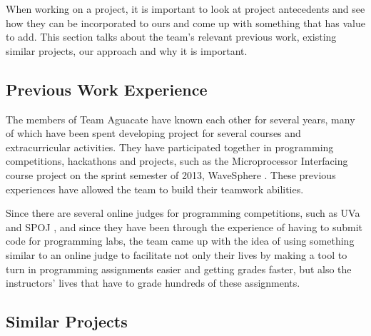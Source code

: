 When working on a project, it is important to look at project antecedents and
see how they can be incorporated to ours and come up with something that has
value to add. This section talks about the team's relevant previous work,
existing similar projects, our approach and why it is important.

\subsection{Previous Work Experience}

The members of Team Aguacate have known each other for several years, many of
which have been spent developing project for several courses and extracurricular
activities. They have participated together in programming competitions,
hackathons and projects, such as the Microprocessor Interfacing course project
on the sprint semester of 2013, WaveSphere \cite{Micro2}. These previous
experiences have allowed the team to build their teamwork abilities.

Since there are several online judges for programming competitions, such as UVa
\cite{UVA} and SPOJ \cite{SPOJ}, and since they have been through the experience
of having to submit code for programming labs, the team came up with the idea of
using something similar to an online judge to facilitate not only their lives by
making a tool to turn in programming assignments easier and getting grades
faster, but also the instructors' lives that have to grade hundreds of these
assignments.

\subsection{Similar Projects}


